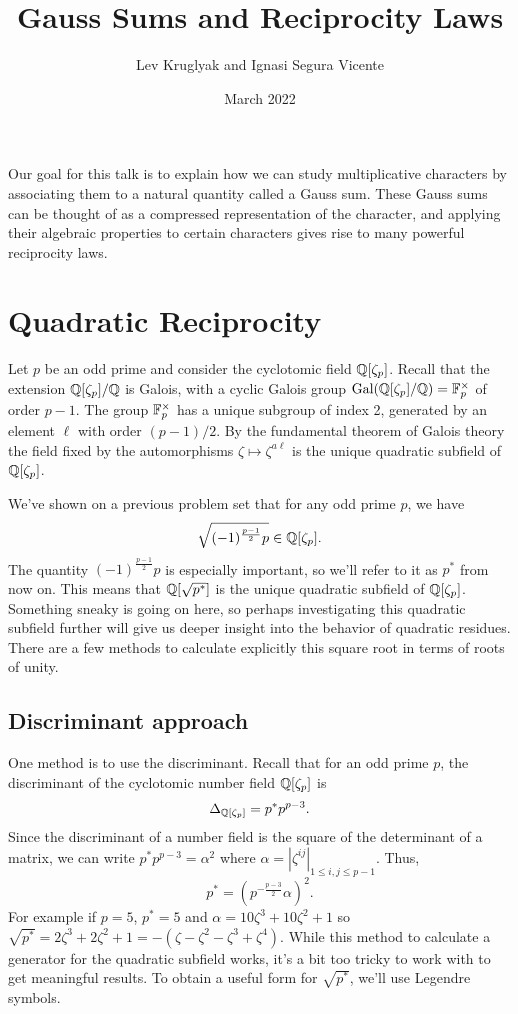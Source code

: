 \documentclass[utf8, letterpaper]{article}
\title{\textbf{Gauss Sums and Reciprocity Laws}}
\author{Lev Kruglyak and Ignasi Segura Vicente}
\date{March 2022}
\begin{document}
\maketitle

Our goal for this talk is to explain how we can study multiplicative characters by associating them to a natural quantity called a Gauss sum. These Gauss sums can be thought of as a compressed representation of the character, and applying their algebraic properties to certain characters gives rise to many powerful reciprocity laws.

\section{Quadratic Reciprocity}

Let $p$ be an odd prime and consider the cyclotomic field $\mathbb{Q}[\zeta_p]$. Recall that the extension $\mathbb{Q}[\zeta_p] /\mathbb{Q}$ is Galois, with a cyclic Galois group $\textrm{Gal}(\mathbb{Q}[\zeta_p] /\mathbb{Q}) = \mathbb{F}_p^\times$ of order $p-1$. The group $\mathbb{F}_p^\times$ has a unique subgroup of index 2, generated by an element $\ell$ with order $(p-1) /2$. By the fundamental theorem of Galois theory the field fixed by the automorphisms $\zeta \mapsto \zeta^{a\ell}$ is the unique quadratic subfield of $\mathbb{Q}[\zeta_p]$. 

We've shown on a previous problem set that for any odd prime $p$, we have
\[
    \sqrt{(-1)^{\frac{p-1}{2}}p} \in \mathbb{Q}[\zeta_p]
.\] 
The quantity $(-1)^{\frac{p-1}{2}}p$ is especially important, so we'll refer to it as $p^*$ from now on. This means that $\mathbb{Q}[\sqrt{p^*}]$ is the unique quadratic subfield of $\mathbb{Q}[\zeta_p]$. Something sneaky is going on here, so perhaps investigating this quadratic subfield further will give us deeper insight into the behavior of quadratic residues. There are a few methods to calculate explicitly this square root in terms of roots of unity. 

\subsection{Discriminant approach}

One method is to use the discriminant. Recall that for an odd prime $p$, the discriminant of the cyclotomic number field $\mathbb{Q}[\zeta_p]$ is \[\Delta_{\mathbb{Q}[\zeta_p]}=p^* p^{p-3}.\]
Since the discriminant of a number field is the square of the determinant of a matrix, we can write $p^*p^{p-3}=\alpha^2$ where $\alpha=|\zeta^{ij}|_{1\leq i,j\leq p-1}$. Thus,
\[
    p^*=(p^{-\frac{p-3}{2}}\alpha)^2
.\] 
For example if $p=5$, $p^*=5$ and $\alpha=10\zeta^3+10\zeta^2+1$ so $\sqrt{p^*}=2\zeta^3+2\zeta^2+1=-(\zeta-\zeta^2-\zeta^3+\zeta^4)$. While this method to calculate a generator for the quadratic subfield works, it's a bit too tricky to work with to get meaningful results. To obtain a useful form for $\sqrt{p^*}$, we'll use Legendre symbols.
\end{document}
